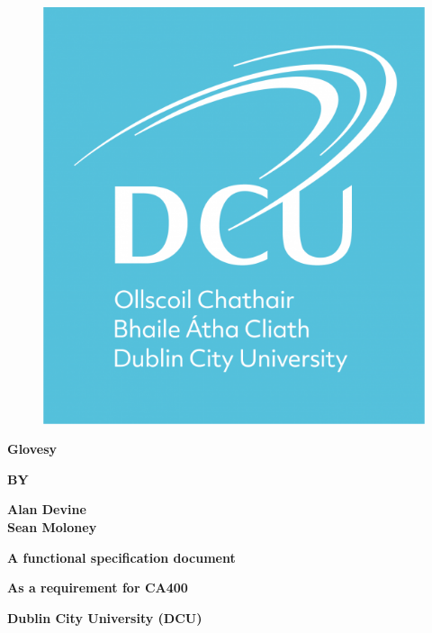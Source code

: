\documentclass[12pt,a4paper,oneside]{book}
\theoremstyle{plain}
\numberwithin{equation}{chapter} \DeclareMathOperator{\Var}{Var}
\begin{document}
\thispagestyle{empty}

\begin{figure}[h!]
\vskip1in
\begin{center}
\includegraphics[width = 3.5 cm]{DCU_logo_square.png}
\end{center}
\end{figure}

\begin{center}
\large{\textbf{Glovesy}}
\end{center}

\vskip2.5cm

\begin{center}
\textbf{BY}
\end{center}

\vskip0.6cm

\begin{center}
\textbf{Alan Devine}\\
\textbf{Sean Moloney}
\end{center}

\vskip3.5cm
 
\begin{center}
\textbf{A functional specification document}
\end{center}

\begin{center}
\textbf{As a requirement for CA400}
\end{center}
\vskip2cm
\begin{center}
\textbf{Dublin City University (DCU)}
\end{center}
\end{document}
